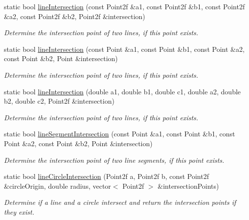 \begin{DoxyCompactItemize}
static bool \hyperlink{classmultiscale_1_1Geometry2D_aae24e97b32bdd8dab88c880d0d25ec86}{line\-Intersection} (const \-Point2f \&a1, const \-Point2f \&b1, const \-Point2f \&a2, const \-Point2f \&b2, \-Point2f \&intersection)
\begin{DoxyCompactList}\small\item\em \-Determine the intersection point of two lines, if this point exists. \end{DoxyCompactList}\item 
static bool \hyperlink{classmultiscale_1_1Geometry2D_aa9d9b17a7e5098c8bde0cd9d3dc08dc2}{line\-Intersection} (const \-Point \&a1, const \-Point \&b1, const \-Point \&a2, const \-Point \&b2, \-Point \&intersection)
\begin{DoxyCompactList}\small\item\em \-Determine the intersection point of two lines, if this point exists. \end{DoxyCompactList}\item 
static bool \hyperlink{classmultiscale_1_1Geometry2D_a51a867b90c8492ce4ce85c227788678b}{line\-Intersection} (double a1, double b1, double c1, double a2, double b2, double c2, \-Point2f \&intersection)
\begin{DoxyCompactList}\small\item\em \-Determine the intersection point of two lines, if this point exists. \end{DoxyCompactList}\item 
static bool \hyperlink{classmultiscale_1_1Geometry2D_a9931c3d8089d658186a8c1ac78db5773}{line\-Segment\-Intersection} (const \-Point \&a1, const \-Point \&b1, const \-Point \&a2, const \-Point \&b2, \-Point \&intersection)
\begin{DoxyCompactList}\small\item\em \-Determine the intersection point of two line segments, if this point exists. \end{DoxyCompactList}\item 
static bool \hyperlink{classmultiscale_1_1Geometry2D_ab04c08f83d066f0d936d516d015ea62c}{line\-Circle\-Intersection} (\-Point2f a, \-Point2f b, const \-Point2f \&circle\-Origin, double radius, vector$<$ \-Point2f $>$ \&intersection\-Points)
\begin{DoxyCompactList}\small\item\em \-Determine if a line and a circle intersect and return the intersection points if they exist. \end{DoxyCompactList}\item 

\end{DoxyCompactItemize}
